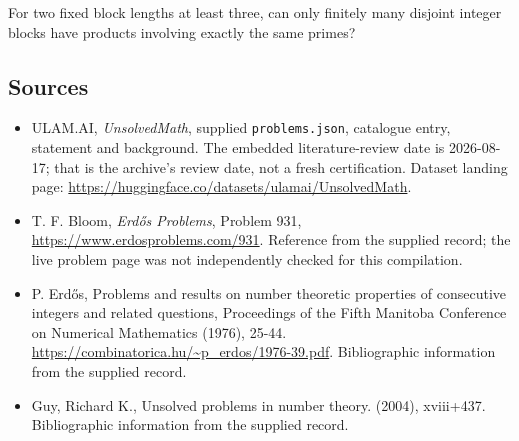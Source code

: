 \documentclass[11pt,a4paper]{article}
\begin{document}
For two fixed block lengths at least three, can only finitely many disjoint integer blocks have products involving exactly the same primes?

\subsection{Sources}

{\small

\begin{itemize}

\item[\hypertarget{source:statement:1}{S1}] ULAM.AI, \emph{UnsolvedMath}, supplied \texttt{problems.json}, catalogue entry, statement and background. The embedded literature-review date is 2026-08-17; that is the archive’s review date, not a fresh certification. Dataset landing page: \url{https://huggingface.co/datasets/ulamai/UnsolvedMath}.

\item[\hypertarget{source:statement:2}{S2}] T. F. Bloom, \emph{Erdős Problems}, Problem 931, \url{https://www.erdosproblems.com/931}. Reference from the supplied record; the live problem page was not independently checked for this compilation.

\item[\hypertarget{source:statement:3}{S3}] P. Erdős, Problems and results on number theoretic properties of consecutive integers and related questions, Proceedings of the Fifth Manitoba Conference on Numerical Mathematics (1976), 25-44. \url{https://combinatorica.hu/~p_erdos/1976-39.pdf}. Bibliographic information from the supplied record.

\item[\hypertarget{source:statement:4}{S4}] Guy, Richard K., Unsolved problems in number theory. (2004), xviii+437. Bibliographic information from the supplied record.

\end{itemize}

}

\label{end:statement}
\end{document}
